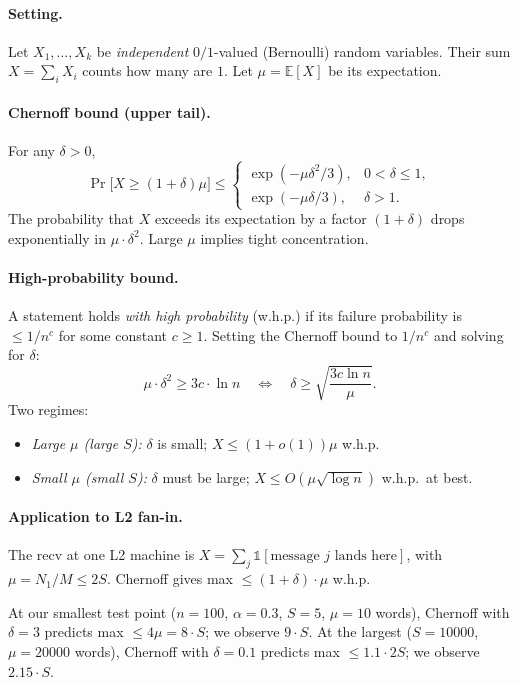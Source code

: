 \documentclass[11pt]{article}
\begin{document}
\paragraph{Setting.} Let $X_1, \ldots, X_k$ be \textit{independent}
$0/1$-valued (Bernoulli) random variables. Their sum $X = \sum_i X_i$ counts
how many are $1$. Let $\mu = \mathbb{E}[X]$ be its expectation.

\paragraph{Chernoff bound (upper tail).} For any $\delta > 0$,
\[
    \Pr\bigl[X \ge (1+\delta)\mu\bigr] \le
    \begin{cases}
        \exp(-\mu \delta^2 / 3), & 0 < \delta \le 1, \\[4pt]
        \exp(-\mu \delta / 3),   & \delta > 1.
    \end{cases}
\]
The probability that $X$ exceeds its expectation by a factor $(1 + \delta)$
drops exponentially in $\mu \cdot \delta^2$. Large $\mu$ implies tight
concentration.

\paragraph{High-probability bound.} A statement holds \textit{with high
probability} (w.h.p.) if its failure probability is $\le 1/n^c$ for some
constant $c \ge 1$. Setting the Chernoff bound to $1/n^c$ and solving for
$\delta$:
\[
    \mu \cdot \delta^2 \ge 3c \cdot \ln n
    \quad\Longleftrightarrow\quad
    \delta \ge \sqrt{\frac{3c \ln n}{\mu}}.
\]
Two regimes:
\begin{itemize}[topsep=2pt, itemsep=2pt, leftmargin=*]
    \item \textit{Large $\mu$ (large $S$):} $\delta$ is small;
          $X \le (1 + o(1)) \mu$ w.h.p.
    \item \textit{Small $\mu$ (small $S$):} $\delta$ must be large;
          $X \le O(\mu \sqrt{\log n})$ w.h.p.\ at best.
\end{itemize}

\paragraph{Application to L2 fan-in.} The recv at one L2 machine is
$X = \sum_j \mathbb{1}[\text{message }j\text{ lands here}]$, with
$\mu = N_1 / M \le 2S$. Chernoff gives max $\le (1 + \delta) \cdot \mu$
w.h.p.

At our smallest test point ($n = 100$, $\alpha = 0.3$, $S = 5$, $\mu = 10$
words), Chernoff with $\delta = 3$ predicts max $\le 4 \mu = 8 \cdot S$;
we observe $9 \cdot S$. At the largest ($S = 10000$, $\mu = 20000$ words),
Chernoff with $\delta = 0.1$ predicts max $\le 1.1 \cdot 2 S$; we observe
$2.15 \cdot S$.
\end{document}
